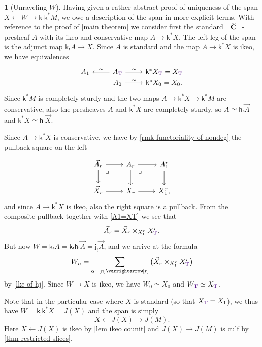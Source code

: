 \documentclass{amsart}
\makeatletter
\newcommand{\contr}{\mathbf{C}}
\def\overarrow#1{{\vec{#1}}}
\def\nondeg{\overarrow}
\newcommand*\wt[1]{\mathpalette\wthelper{#1}}
\newcommand*\wthelper[2]{%
        \hbox{\dimen@\accentfontxheight#1%
                \accentfontxheight#11.3\dimen@
                $\m@th#1\widetilde{#2}$%
                \accentfontxheight#1\dimen@
        }%
}
\newcommand*\accentfontxheight[1]{%
        \fontdimen5\ifx#1\displaystyle
                \textfont
        \else\ifx#1\textstyle
                \textfont
        \else\ifx#1\scriptstyle
                \scriptfont
        \else
                \scriptscriptfont
        \fi\fi\fi3
}
\newcommand{\Tcontr}{\wt\contr}
\newcommand{\Tob}{\textup{\color{Indigo}T}}
\newcommand{\lilh}{\mathsf{h}}
\newcommand{\lilj}{\mathsf{j}}
\newcommand{\lilk}{\mathsf{k}}
\newcommand{\ract}{\varrightarrow\mapsfromchar}
\theoremstyle{definition}
\theoremstyle{noname}
\newtheorem{blanko}[theorem]{}
\makeatother
\begin{document}
\begin{blanko}[Unraveling \texorpdfstring{$W$}{W}]\label{unravel}
  Having given a rather abstract proof of uniqueness of 
  the span $X\leftarrow W \to 
  \lilk_!\lilk^*M$,
  we owe a description of the span in more explicit terms.
With reference to the proof of \cref{main theorem} we consider first
the standard $\Tcontr$-presheaf $A$ with its ikeo and conservative map $A \to \lilk^* X$.
The left leg of the span is the adjunct map $\lilk_! A \to X$.
Since $A$ is standard and the map $A \to \lilk^* X$ is ikeo, we have equivalences
\begin{equation}\label{A1=XT}
  \begin{tikzcd}[row sep=0pt, baseline=5.2pt]
A_1 & A_\Tob \lar["\sim"'] \rar["\sim"] & \lilk^*X_\Tob = X_\Tob \\
& A_0 \rar["\sim"] & \lilk^*X_0 = X_0.
\end{tikzcd}
\end{equation}
Since $\lilk^*M$ is completely sturdy and 
the two maps $A\to\lilk^* X\to \lilk^*M$ are conservative,
also the presheaves $A$ and $\lilk^*X$ are completely sturdy, so $A \simeq \lilh_! \vec{A}$ and
$\lilk^* X \simeq \lilh_! \vec{X}$.

Since $A \to \lilk^* X$ is conservative, we have by \cref{rmk functoriality of nondeg}
the pullback square on the left
\[ \begin{tikzcd}
\vec{A}_r \rar \dar \drar[phantom, "\lrcorner" very near start]& A_r \rar \dar 
\drar[phantom, "\lrcorner" very near start] & A_1^{r} \dar \\
\vec{X}_r \rar & X_r \rar & X_1^{r} ,
\end{tikzcd} \]
and since $A \to \lilk^* X$ is ikeo, also the right square is
a pullback.
From the composite pullback together with \eqref{A1=XT}
we see that
\[
  \vec{A}_r = \vec{X}_r \times_{X_1^r} X_\Tob^r.
\]
But now $W = \lilk_! A = \lilk_! \lilh_! \vec{A} = \lilj_! \vec{A}$, and we arrive at
the formula
\[
  W_n = \sum_{\alpha\colon [n]\ract[r]} \big( \nondeg X_r \times_{X_1^r} X_\Tob^r \big)
\]
by \cref{lke of hj}.
Since $W \to X$ is ikeo, we have $W_0 \simeq X_0$ and $W_\Tob \simeq X_\Tob$.

Note that in the particular case where $X$ is standard (so that $X_\Tob=X_1$), we thus
have $W = \lilk_! \lilk^* X = J(X)$ and the span is simply
$$
X \leftarrow J(X) \rightarrow J(M)  .
$$
Here $X\leftarrow J(X)$ is ikeo by \cref{lem ikeo counit} and 
$J(X)\to J(M)$ is culf by \cref{thm restricted slices}.
\end{blanko}
\end{document}
